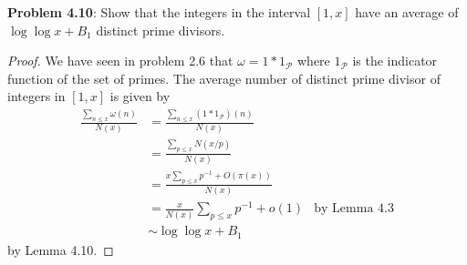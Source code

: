 \documentclass[12pt]{article}
\begin{document}
\fi

\textbf{Problem 4.10}: Show that the integers in the interval $[1, x]$ have an average of $\log \log x + B_1$ distinct prime divisors.

\begin{proof}
\renewcommand{\P}{\mathcal{P}}
We have seen in problem 2.6 that $\omega = 1 * 1_\P$ where $1_\P$ is the indicator function of the set of primes. The average number of distinct prime divisor of integers in $[1, x]$ is given by
\begin{align*}
\frac{\sum_{n \leq x} \omega(n)}{N(x)} &= \frac{\sum_{n \leq x} (1 * 1_\P)(n)}{N(x)}\\
&= \frac{\sum_{p \leq x} N(x/p)}{N(x)}\\
&= \frac{x \sum_{p \leq x} p^{-1} + O(\pi(x))}{N(x)}\\
&= \frac{x}{N(x)} \sum_{p \leq x} p^{-1} + o(1) &\text{by Lemma 4.3}\\
&\sim \log \log x + B_1
\end{align*}
by Lemma 4.10.
\end{proof}

\unless\ifdefined\IsMainDocument
\end{document}
